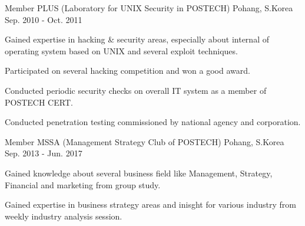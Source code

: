 \begin{cventries}
  \cventry
  {Member} %
  {PLUS (Laboratory for UNIX Security in POSTECH)} %
  {Pohang, S.Korea} %
  {Sep. 2010 - Oct. 2011} %
  {
    \begin{cvitems} %
    \item {Gained expertise in hacking \& security areas, especially about internal of operating system based
      on UNIX and several exploit techniques.}
    \item {Participated on several hacking competition and won a good award.}
    \item {Conducted periodic security checks on overall IT system as a member of POSTECH CERT.}
    \item {Conducted penetration testing commissioned by national agency and corporation.}
    \end{cvitems}
  }

  \cventry
  {Member} %
  {MSSA (Management Strategy Club of POSTECH)} %
  {Pohang, S.Korea} %
  {Sep. 2013 - Jun. 2017} %
  {
    \begin{cvitems} %
    \item {Gained knowledge about several business field like Management, Strategy, Financial and marketing
      from group study.}
    \item {Gained expertise in business strategy areas and inisght for various industry from weekly industry
      analysis session.}
    \end{cvitems}
  }

\end{cventries}
